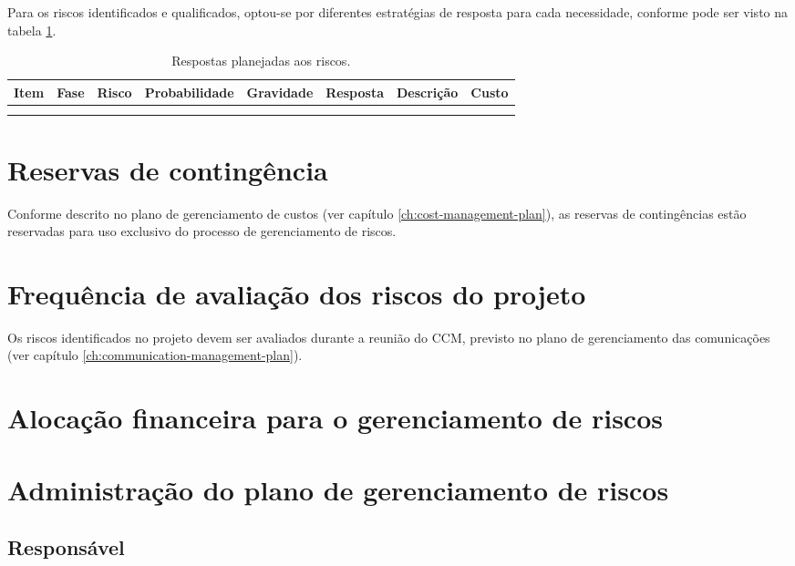 Para os riscos identificados e qualificados, optou-se por diferentes estratégias de resposta para cada necessidade, conforme pode ser visto na tabela \ref{tab:risk-answers}.


\begin{longtable}{ l l l l l l l l }
	\toprule
	\textbf{Item} & \textbf{Fase} & \textbf{Risco} & \textbf{Probabilidade} & \textbf{Gravidade} & \textbf{Resposta} & \textbf{Descrição} & \textbf{Custo} \\
	\midrule
	  &   &   &   &   &   &   &   \\
	\bottomrule
	\caption{Respostas planejadas aos riscos.}
	\centering
    \label{tab:risk-answers}
\end{longtable}

\section{Reservas de contingência}

Conforme descrito no plano de gerenciamento de custos (ver capítulo \ref{ch:cost-management-plan}), as reservas de contingências estão reservadas para uso exclusivo do processo de gerenciamento de riscos.

\section{Frequência de avaliação dos riscos do projeto}

Os riscos identificados no projeto devem ser avaliados durante a reunião do CCM, previsto no plano de gerenciamento das comunicações (ver capítulo \ref{ch:communication-management-plan}).

\section{Alocação financeira para o gerenciamento de riscos}

\section{Administração do plano de gerenciamento de riscos}

\subsection{Responsável}

